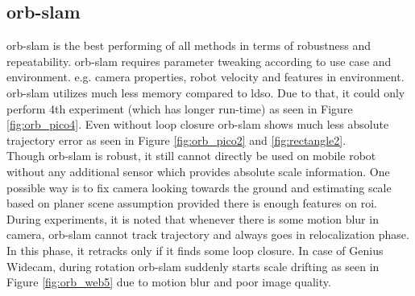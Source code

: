 \subsection{\acrshort{orb}-\acrshort{slam}}
\acrshort{orb}-\acrshort{slam} is the best performing of all methods in terms of robustness and repeatability. \acrshort{orb}-\acrshort{slam} requires parameter tweaking according to use case and environment. e.g. camera properties, robot velocity and features in environment.\\
\newline \acrshort{orb}-\acrshort{slam} utilizes much less memory compared to \acrshort{ldso}. Due to that, it could only perform 4th experiment (which has longer run-time) as seen in Figure \ref{fig:orb_pico4}. Even without loop closure \acrshort{orb}-\acrshort{slam} shows much less absolute trajectory error as seen in Figure \ref{fig:orb_pico2} and \ref{fig:rectangle2}.\\
\newline Though \acrshort{orb}-\acrshort{slam} is robust, it still cannot directly be used on mobile robot without any additional sensor which provides absolute scale information. One possible way is to fix camera looking towards the ground and estimating scale based on planer scene assumption provided there is enough features on \acrshort{roi}. During experiments, it is noted that whenever there is some motion blur in camera, \acrshort{orb}-\acrshort{slam} cannot track trajectory and always goes in relocalization phase. In this phase, it retracks only if it finds some loop closure. In case of Genius Widecam, during rotation \acrshort{orb}-\acrshort{slam} suddenly starts scale drifting as seen in Figure \ref{fig:orb_web5} due to motion blur and poor image quality.

